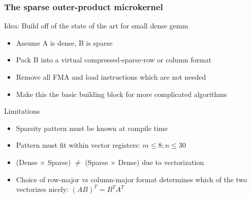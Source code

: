 \documentclass[9pt]{beamer}
\begin{document}
\begin{frame}
  \frametitle{The sparse outer-product microkernel}

  \begin{block}{Idea: Build off of the state of the art for small dense gemm}
    \begin{itemize}
    \item Assume A is dense, B is sparse
    \item Pack B into a virtual compressed-sparse-row or column format
    \item Remove all FMA and load instructions which are not needed
    \item Make this the basic building block for more complicated algorithms 
    \end{itemize}
  \end{block}
  \begin{block}{Limitations}
    \begin{itemize}
    \item Sparsity pattern must be known at compile time
    \item Pattern must fit within vector registers: $m \leq 8;  n \leq 30$
    \item (Dense $\times$ Sparse) $\neq$ (Sparse $\times$ Dense) due to vectorization
    \item Choice of row-major vs column-major format determines which of the two vectorizes nicely: $(AB)^T = B^T A^T$
    \end{itemize}
  \end{block}
\end{frame}
\end{document}

